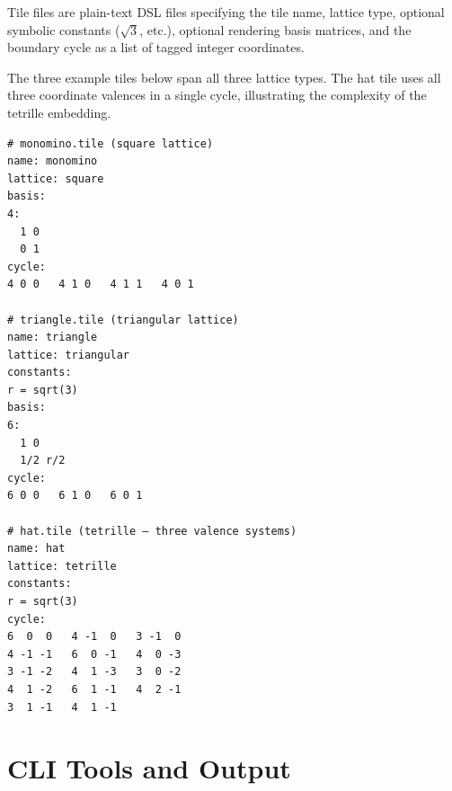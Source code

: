 \documentclass[10pt,a4paper]{article}
\let\polysection\section
\renewcommand\section{\needspace{0.16\textheight}\polysection}
\newcommand{\file}[1]{\texttt{\footnotesize #1}}
\begin{document}
\begin{tcolorbox}[dualbox, title=Tile DSL — \file{tiles/*.tile}]
  Tile files are plain-text DSL files specifying the tile name,
  lattice type, optional symbolic constants ($\sqrt{3}$, etc.),
  optional rendering basis matrices, and the boundary cycle as a list
  of tagged integer coordinates.

  The three example tiles below span all three lattice types.
  The hat tile uses all three coordinate valences in a single cycle,
  illustrating the complexity of the tetrille embedding.
\tcblower
\begin{verbatim}
# monomino.tile (square lattice)
name: monomino
lattice: square
basis:
4:
  1 0
  0 1
cycle:
4 0 0   4 1 0   4 1 1   4 0 1

# triangle.tile (triangular lattice)
name: triangle
lattice: triangular
constants:
r = sqrt(3)
basis:
6:
  1 0
  1/2 r/2
cycle:
6 0 0   6 1 0   6 0 1

# hat.tile (tetrille — three valence systems)
name: hat
lattice: tetrille
constants:
r = sqrt(3)
cycle:
6  0  0   4 -1  0   3 -1  0
4 -1 -1   6  0 -1   4  0 -3
3 -1 -2   4  1 -3   3  0 -2
4  1 -2   6  1 -1   4  2 -1
3  1 -1   4  1 -1
\end{verbatim}
\end{tcolorbox}

\section{CLI Tools and Output}
\end{document}
